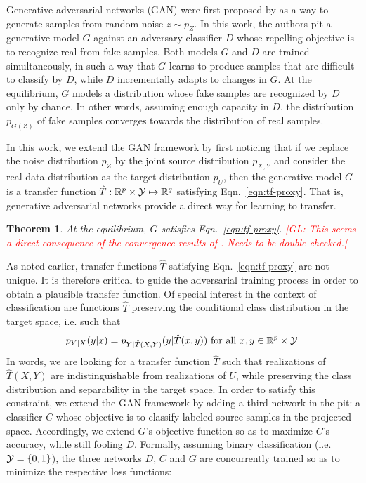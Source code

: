 \documentclass{article}
\newcommand{\glnote}[1]{\textcolor{red}{[GL: #1]}}
\theoremstyle{plain}
\newtheorem{theorem}{Theorem}
\begin{document}
Generative adversarial networks (GAN) were first proposed by
\cite{goodfellow2014generative} as a way to generate samples from random noise
$z \sim p_Z$. In this work, the authors pit a generative model $G$ against an
adversary classifier $D$ whose repelling objective is to recognize real from
fake samples. Both models $G$ and $D$ are trained simultaneously, in such a way
that $G$ learns to produce samples that are difficult to classify by $D$, while
$D$ incrementally adapts to changes in $G$. At the equilibrium, $G$ models a
distribution whose fake samples are recognized by $D$ only by chance. In other
words, assuming enough capacity in $D$, the distribution $p_{G(Z)}$ of fake
samples converges towards the distribution of real samples.

In this work, we extend the GAN framework by first noticing that if we replace
the noise distribution $p_Z$ by the joint source distribution $p_{X,Y}$ and consider
the real data distribution as the target distribution $p_U$, then the generative
model $G$ is a transfer function $\hat T : \mathbb{R}^p \times {\cal Y} \mapsto \mathbb{R}^q$
satisfying Eqn.~\ref{eqn:tf-proxy}. That is, generative adversarial networks
provide a direct way for learning to transfer.

\begin{theorem}
At the equilibrium, $G$ satisfies Eqn.~\ref{eqn:tf-proxy}. \glnote{This seems a direct consequence of the convergence results of \cite{goodfellow2014generative}. Needs to be double-checked.}
\end{theorem}

As noted earlier, transfer functions $\hat T$ satisfying Eqn.~\ref{eqn:tf-proxy}
are not unique. It is therefore critical to guide
the adversarial training process in order to obtain a plausible transfer
function. Of special interest in the context of classification
are functions $\hat T$  preserving the conditional class distribution in the target space,
i.e. such that
\begin{equation}\label{eqn:preservation}
    p_{Y|X}(y|x) = p_{Y|\hat T(X, Y)}(y|\hat T(x, y)) ~\text{for all}~ x, y \in \mathbb{R}^p \times {\cal Y}.
\end{equation}
In words, we are looking for a transfer function $\hat T$ such that realizations
of $\hat T(X,Y)$ are indistinguishable from realizations of $U$, while preserving
the class distribution and separability in the target space.
In order to satisfy this constraint, we extend the GAN framework by
adding a third network in the pit: a classifier $C$ whose objective is to classify
labeled source samples in the projected space.
Accordingly, we extend $G$'s objective function so as to maximize $C$'s accuracy,
while still fooling $D$. Formally, assuming binary classification (i.e. ${\cal Y} = \{0, 1\}$), the three networks $D$, $C$ and $G$ are
concurrently trained so as to minimize the respective loss functions:
\end{document}
